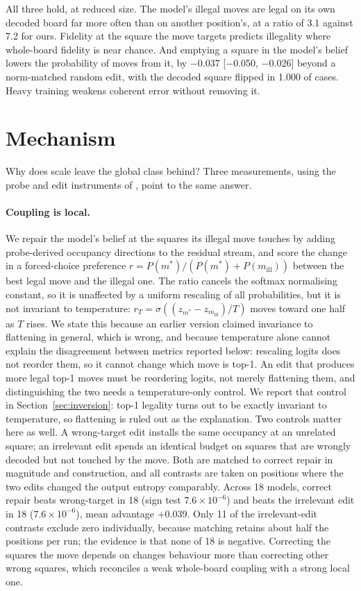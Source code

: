 \documentclass[11pt]{article}
\newcommand{\priort}{\citet{rathore2026coherent}}
\begin{document}
All three hold, at reduced size. The model's illegal moves are legal on its own
decoded board far more often than on another position's, at a ratio of
3.1 against 7.2 for ours. Fidelity at the square
the move targets predicts illegality where whole-board fidelity is near chance.
And emptying a square in the model's belief lowers the probability of moves from
it, by $-$0.037 [$-$0.050, $-$0.026] beyond a
norm-matched random edit, with the decoded square flipped in 1.000 of
cases. Heavy training weakens coherent error without removing it.

\section{Mechanism}
\label{sec:mech}

Why does scale leave the global class behind? Three measurements, using the probe
and edit instruments of \priort, point to the same answer.

\paragraph{Coupling is local.}
We repair the model's belief at the squares its illegal move touches by adding
probe-derived occupancy directions to the residual stream, and score the change in
a forced-choice preference $r = P(m^\ast)/(P(m^\ast)+P(m_{\mathrm{ill}}))$ between
the best legal move and the illegal one. The ratio cancels the softmax normalising
constant, so it is unaffected by a uniform rescaling of all probabilities, but it is
not invariant to temperature: $r_T = \sigma((z_{m^\ast} - z_{m_{\mathrm{ill}}})/T)$ moves
toward one half as $T$ rises. We state this because an earlier version claimed
invariance to flattening in general, which is wrong, and because temperature alone
cannot explain the disagreement between metrics reported below: rescaling logits
does not reorder them, so it cannot change which move is top-1. An edit that
produces more legal top-1 moves must be reordering logits, not merely flattening
them, and distinguishing the two needs a temperature-only control. We report that
control in Section~\ref{sec:inversion}: top-1 legality turns out to be exactly
invariant to temperature, so flattening is ruled out as the explanation. Two controls
matter here as well. A wrong-target edit installs the same
occupancy at an unrelated square; an irrelevant edit spends an identical budget on
squares that are wrongly decoded but not touched by the move. Both are matched to
correct repair in magnitude and construction, and all contrasts are taken on
positions where the two edits changed the output entropy comparably. Across
18 models, correct repair beats wrong-target in
18 (sign test $7.6\times10^{-6}$) and beats the irrelevant edit in
18 ($7.6\times10^{-6}$), mean advantage +0.039. Only
11 of the irrelevant-edit contrasts exclude zero individually,
because matching retains about half the positions per run; the evidence is that
none of 18 is negative. Correcting the squares the move depends on
changes behaviour more than correcting other wrong squares, which reconciles a
weak whole-board coupling \citep{balogh2026verification} with a strong local one.
\end{document}
